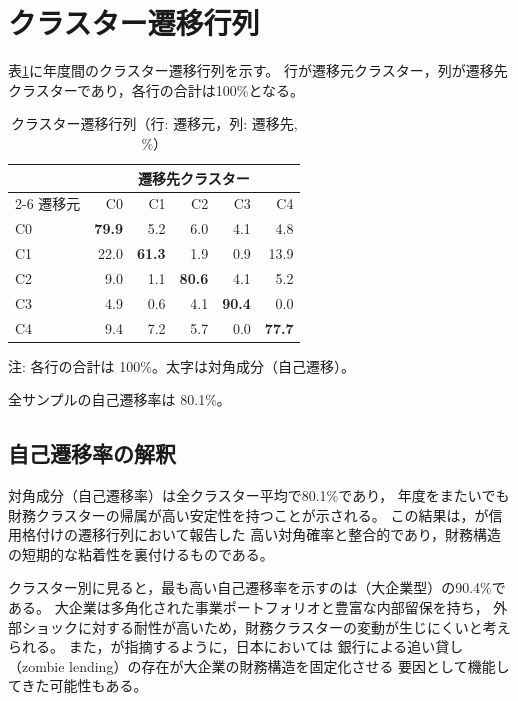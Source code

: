 \section{クラスター遷移行列}
\label{sec:results-transition}

表\ref{tab:transition-matrix}に年度間のクラスター遷移行列を示す。
行が遷移元クラスター，列が遷移先クラスターであり，各行の合計は100\%となる。

\begin{table}[htbp]
  \centering
  \caption{クラスター遷移行列（行: 遷移元，列: 遷移先, \%）}
  \label{tab:transition-matrix}
  \begin{tabular}{lrrrrr}
    \toprule
    & \multicolumn{5}{c}{遷移先クラスター} \\
    \cmidrule(lr){2-6}
    遷移元 & C0 & C1 & C2 & C3 & C4 \\
    \midrule
    C0 & \textbf{79.9} & 5.2  & 6.0  & 4.1  & 4.8 \\
    C1 & 22.0 & \textbf{61.3} & 1.9  & 0.9  & 13.9 \\
    C2 & 9.0  & 1.1  & \textbf{80.6} & 4.1  & 5.2 \\
    C3 & 4.9  & 0.6  & 4.1  & \textbf{90.4} & 0.0 \\
    C4 & 9.4  & 7.2  & 5.7  & 0.0  & \textbf{77.7} \\
    \bottomrule
  \end{tabular}
  \begin{tablenotes}
    \small
    \item 注: 各行の合計は 100\%。太字は対角成分（自己遷移）。
    \item 全サンプルの自己遷移率は 80.1\%。
  \end{tablenotes}
\end{table}

\subsection{自己遷移率の解釈}

対角成分（自己遷移率）は全クラスター平均で80.1\%であり，
年度をまたいでも財務クラスターの帰属が高い安定性を持つことが示される。
この結果は，が信用格付けの遷移行列において報告した
高い対角確率と整合的であり，財務構造の短期的な粘着性を裏付けるものである。

クラスター別に見ると，最も高い自己遷移率を示すのは（大企業型）の90.4\%である。
大企業は多角化された事業ポートフォリオと豊富な内部留保を持ち，
外部ショックに対する耐性が高いため，財務クラスターの変動が生じにくいと考えられる。
また，が指摘するように，日本においては
銀行による追い貸し（zombie lending）の存在が大企業の財務構造を固定化させる
要因として機能してきた可能性もある。

